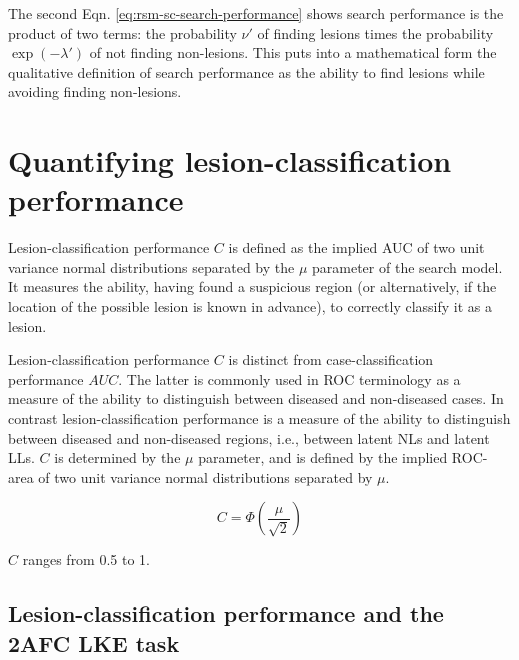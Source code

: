 \documentclass[
]{book}
\begin{document}
The second Eqn. \eqref{eq:rsm-sc-search-performance} shows search performance is the product of two terms: the probability \(\nu'\) of finding lesions times the probability \(\exp\left ( -\lambda' \right )\) of not finding non-lesions. This puts into a mathematical form the qualitative definition of search performance as the ability to find lesions while avoiding finding non-lesions.

\hypertarget{rsm-sc-performance}{%
\section{Quantifying lesion-classification performance}\label{rsm-sc-performance}}

Lesion-classification performance \(C\) is defined as the implied AUC of two unit variance normal distributions separated by the \(\mu\) parameter of the search model. It measures the ability, having found a suspicious region (or alternatively, if the location of the possible lesion is known in advance), to correctly classify it as a lesion.

Lesion-classification performance \(C\) is distinct from case-classification performance \(AUC\). The latter is commonly used in ROC terminology as a measure of the ability to distinguish between diseased and non-diseased cases. In contrast lesion-classification performance is a measure of the ability to distinguish between diseased and non-diseased regions, i.e., between latent NLs and latent LLs. \(C\) is determined by the \(\mu\) parameter, and is defined by the implied ROC-area of two unit variance normal distributions separated by \(\mu\).

\begin{equation}
C=\Phi\left ( \frac{\mu}{\sqrt{2}} \right )
\label{eq:rsm-sc-classification-performance}
\end{equation}

\(C\) ranges from 0.5 to 1.

\hypertarget{rsm-sc-search-classification-2afc-lke}{%
\subsection{Lesion-classification performance and the 2AFC LKE task}\label{rsm-sc-search-classification-2afc-lke}}
\end{document}
